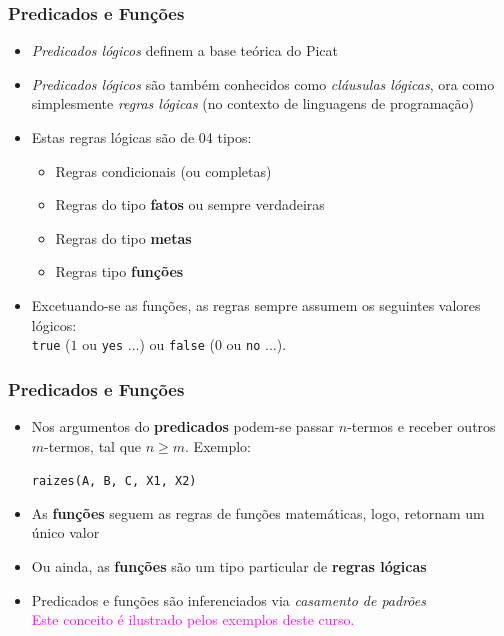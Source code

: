 \begin{frame}[fragile]
\frametitle{Predicados e Funções}
    
\begin{itemize}

\item \textit{Predicados lógicos} definem a base teórica do Picat

\pause
\item \textit{Predicados lógicos} são também conhecidos como \textit{cláusulas lógicas},  ora como
simplesmente \textit{regras lógicas} (no contexto de linguagens de programação)

\pause
\item Estas regras lógicas são de 04 tipos: 
\pause
\begin{itemize}

   \item Regras condicionais (ou completas)
   \item Regras do tipo \textbf{fatos} ou sempre verdadeiras
   \item Regras do tipo \textbf{metas}
   \item Regras tipo \textbf{funções}
\end{itemize}

\pause
\item Excetuando-se as funções, as regras sempre assumem os seguintes valores lógicos:\\
 \texttt{true} ($1$ ou \texttt{yes} ...) ou \texttt{false} ($0$ ou \texttt{no} ...).

\end{itemize}
\end{frame}


\begin{frame}[fragile]
\frametitle{Predicados e Funções}
    
\begin{itemize}


\item Nos argumentos do \textbf{predicados} podem-se passar $n$-termos e receber
outros $m$-termos, tal que $n \ge m$. Exemplo:\\

\begin{center}
  \texttt{raizes(A, B, C, X1, X2)}
\end{center}

\pause
\item As \textbf{funções}  seguem as regras de funções matemáticas, logo,
retornam um único valor

\pause
\item Ou ainda, as \textbf{funções} são  um tipo particular de \textbf{regras lógicas}

\pause
\item Predicados e funções são inferenciados via \textit{casamento de padrões}\\
\textcolor{magenta}{Este conceito é ilustrado pelos exemplos deste curso.}


 \end{itemize}
\end{frame}


